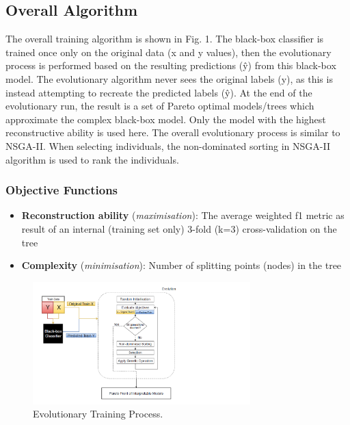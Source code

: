 \subsection{Overall Algorithm}
The overall training algorithm is shown in Fig. 1. The black-box classifier is trained once only on the original data (x and y values), then the evolutionary process is performed based on the resulting predictions (\^{y}) from this black-box model. The evolutionary algorithm never sees the original labels (y), as this is instead attempting to recreate the predicted labels (\^{y}). At the end of the evolutionary run, the result is a set of Pareto optimal models/trees which approximate the complex black-box model. Only the model with the highest reconstructive ability is used here. The overall evolutionary process is similar to NSGA-II. When selecting individuals, the non-dominated sorting in NSGA-II algorithm is used to rank the individuals.
\subsubsection{Objective Functions}
\begin{itemize}
\item \textbf{Reconstruction ability} (\textit{maximisation}): The average weighted f1 metric as result of an internal (training set only) 3-fold (k=3) cross-validation on the tree
\end{itemize}
\begin{itemize}
\item \textbf{Complexity} (\textit{minimisation}): Number of splitting points (nodes) in the tree
\end{itemize}

\begin{figure}
\includegraphics[width=0.75\textwidth]{evolution_process_resized}
\caption{Evolutionary Training Process.}
\end{figure}

